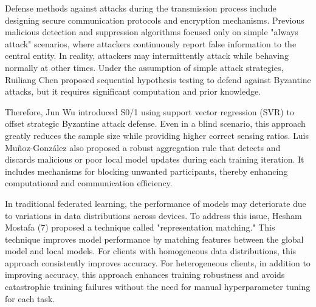 \documentclass[conference]{IEEEtran}
\begin{document}
Defense methods against attacks during the transmission process include designing secure communication protocols and encryption mechanisms.
Previous malicious detection and suppression algorithms focused only on simple
"always attack" scenarios, where attackers continuously report false information
to the central entity. In reality, attackers may intermittently attack while
behaving normally at other times. Under the assumption of simple attack strategies,
Ruiliang Chen \cite{b129} proposed sequential hypothesis testing to defend against Byzantine attacks,
but it requires significant computation and prior knowledge.


Therefore, Jun Wu \cite{b119} introduced S0/1 using support vector regression (SVR) to offset strategic
Byzantine attack defense. Even in a blind scenario,
this approach greatly reduces the sample size while providing higher correct sensing ratios.
Luis Muñoz-González \cite{b127} also proposed a robust aggregation
rule that detects and discards malicious or poor local model
updates during each training iteration.
It includes mechanisms for blocking unwanted participants, thereby enhancing computational and communication efficiency.


In traditional federated learning, the performance of models may deteriorate due to variations in data distributions across devices.
To address this issue, Hesham Mostafa (7) proposed a technique called "representation matching."
This technique improves model performance by matching features between the global model
and local models. For clients with homogeneous data distributions, this approach
consistently improves accuracy. For heterogeneous clients, in addition to
improving accuracy, this approach enhances training robustness and avoids
catastrophic training failures without the need for manual hyperparameter tuning for each task.
\end{document}
